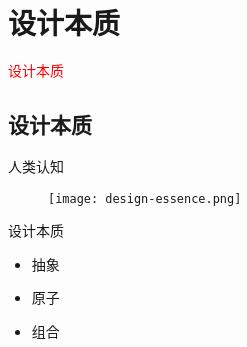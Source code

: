 \section{设计本质}
\label{sec:essence}

\begin{frame}
  \begin{center}
    \Huge{\textcolor{red}{设计本质}}
  \end{center}
\end{frame}

\subsection{设计本质}

\begin{frame}{人类认知}
  \begin{figure}
    \centering
    \texttt{[image: design-essence.png]}
  \end{figure}
\end{frame}

\begin{frame}{设计本质}
    \begin{itemize}
    \item \alert{抽象}
    \item \alert{原子}
    \item \alert{组合}
    \end{itemize}
\end{frame}
